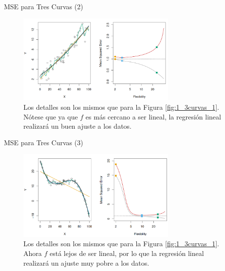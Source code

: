 \documentclass[usenames,dvipsnames]{beamer} %
\begin{document}
\begin{frame}{MSE para Tres Curvas (2)}
\begin{figure}
	\centering
	\includegraphics[width=0.7\textwidth]{images/islr/fig_2_10.png}
	\caption{Los detalles son los mismos que para la Figura \ref{fig:1_3curvas_1}. N\'otese que ya que $f$ es m\'as cercano  a ser lineal, la regresi\'on lineal realizar\'a un buen ajuste a los datos.}
	\label{fig:1_3curvas_2}
\end{figure}
\end{frame}

\begin{frame}{MSE para Tres Curvas (3)}
\begin{figure}
	\centering
	\includegraphics[width=0.7\textwidth]{images/islr/fig_2_11.png}
	\caption{Los detalles son los mismos que para la Figura \ref{fig:1_3curvas_1}. Ahora $f$ est\'a lejos de ser lineal, por lo que la regresi\'on lineal realizar\'a un ajuste muy pobre a los datos.}
	\label{fig:1_3curvas_3}
\end{figure}
\end{frame}
\end{document}
